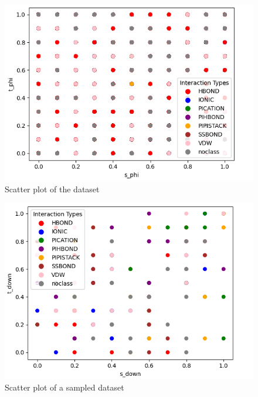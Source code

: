 \documentclass[10pt,twocolumn,letterpaper]{article}
\begin{document}
\begin{center}
    \begin{figure}[h!]
        \centering
        \includegraphics[scale=0.4]{img/scatterOriginalDS.png}
        \caption{Scatter plot of the dataset}
        \label{fig:scatterDataset}
    \end{figure}
\end{center}
\begin{center}
    \begin{figure}[h!]
        \centering
        \includegraphics[scale=0.4]{img/ScatterSampled.png}
        \caption{Scatter plot of a sampled dataset}
        \label{fig:scatterSampled}
    \end{figure}
\end{center}

\end{document}

